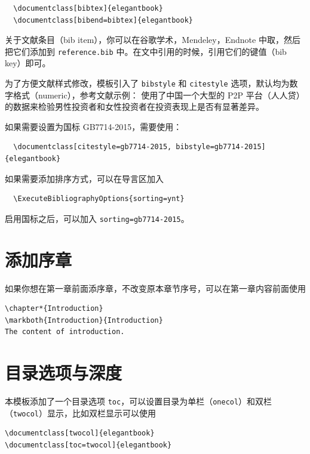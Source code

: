 \documentclass[lang=cn,10pt,cite=super]{elegantbook}
\begin{document}
\begin{lstlisting}
  \documentclass[bibtex]{elegantbook}
  \documentclass[bibend=bibtex]{elegantbook}
\end{lstlisting}

关于文献条目（bib item），你可以在谷歌学术，Mendeley，Endnote 中取，然后把它们添加到 \lstinline{reference.bib} 中。在文中引用的时候，引用它们的键值（bib key）即可。

为了方便文献样式修改，模板引入了 \lstinline{bibstyle} 和 \lstinline{citestyle} 选项，默认均为数字格式（numeric），参考文献示例：\cite{cn1,en2,en3} 使用了中国一个大型的 P2P 平台（人人贷）的数据来检验男性投资者和女性投资者在投资表现上是否有显著差异。

如果需要设置为国标 GB7714-2015，需要使用：
\begin{lstlisting}
  \documentclass[citestyle=gb7714-2015, bibstyle=gb7714-2015]{elegantbook} 
\end{lstlisting}

如果需要添加排序方式，可以在导言区加入
\begin{lstlisting}
  \ExecuteBibliographyOptions{sorting=ynt}
\end{lstlisting}

启用国标之后，可以加入 \lstinline{sorting=gb7714-2015}。

\section{添加序章}

如果你想在第一章前面添序章，不改变原本章节序号，可以在第一章内容前面使用 
\begin{lstlisting}
\chapter*{Introduction}
\markboth{Introduction}{Introduction}
The content of introduction.
\end{lstlisting}

\section{目录选项与深度}
本模板添加了一个目录选项 \lstinline{toc}，可以设置目录为单栏（\lstinline{onecol}）和双栏（\lstinline{twocol}）显示，比如双栏显示可以使用
\begin{lstlisting}
\documentclass[twocol]{elegantbook}
\documentclass[toc=twocol]{elegantbook}
\end{lstlisting}
\end{document}
